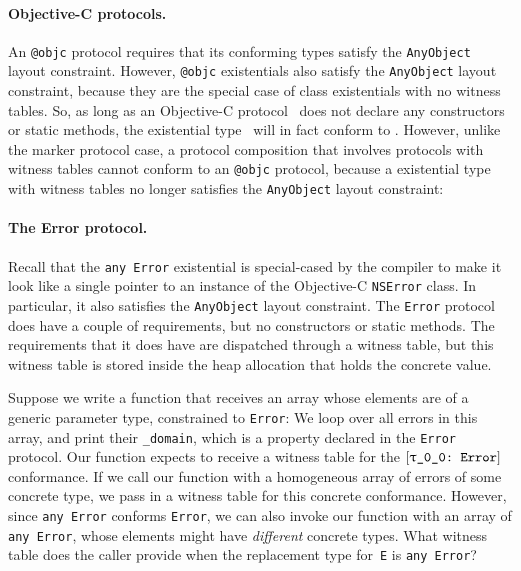 \documentclass[../generics]{subfiles}
\begin{document}
\paragraph{Objective-C protocols.} An \verb|@objc| protocol requires that its conforming types satisfy the \texttt{AnyObject} layout constraint. However, \verb|@objc| existentials also satisfy the \texttt{AnyObject} layout constraint, because they are the special case of class existentials with no witness tables. So, as long as an Objective-C protocol \tP\ does not declare any constructors or static methods, the existential type \AnyP\ will in fact conform to \tP. However, unlike the marker protocol case, a protocol composition that involves protocols with witness tables cannot conform to an \verb|@objc| protocol, because a existential type with witness tables no longer satisfies the \texttt{AnyObject} layout constraint:

\paragraph{The Error protocol.} Recall that the \texttt{any~Error} existential is special-cased by the compiler to make it look like a single pointer to an instance of the Objective-C \texttt{NSError} class. In particular, it also satisfies the \texttt{AnyObject} layout constraint. The \texttt{Error} protocol does have a couple of requirements, but no constructors or static methods. The requirements that it does have are dispatched through a witness table, but this witness table is stored inside the heap allocation that holds the concrete value.

Suppose we write a function that receives an array whose elements are of a generic parameter type, constrained to \texttt{Error}:
We loop over all errors in this array, and print their \verb|_domain|, which is a property declared in the \texttt{Error} protocol. Our function expects to receive a witness table for the $\ConfReq{\rT}{Error}$ conformance. If we call our function with a homogeneous array of errors of some concrete type, we pass in a witness table for this concrete conformance. However, since \texttt{any~Error} conforms \texttt{Error}, we can also invoke our function with an array of \texttt{any Error}, whose elements might have \emph{different} concrete types. What witness table does the caller provide when the replacement type for~\texttt{E} is \texttt{any Error}?
\end{document}
